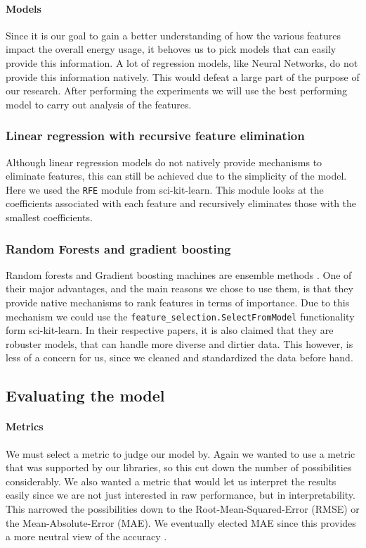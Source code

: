 \documentclass[british]{article}
\newcommand{\code}[1]{\texttt{#1}}
\begin{document}
	\paragraph{Models}Since it is our goal to gain a better understanding of how the various features impact the overall energy usage, it behoves us to pick models that can easily provide this information. A lot of regression models, like Neural Networks, do not provide this information natively. This would defeat a large part of the purpose of our research. After performing the experiments we will use the best performing model to carry out analysis of the features. 
	
	\subsubsection{Linear regression with recursive feature elimination} Although linear regression models do not natively provide mechanisms to eliminate features, this can still be achieved due to the simplicity of the model. Here we used the \code{RFE} module from sci-kit-learn. This module looks at the coefficients associated with each feature and recursively eliminates those with the smallest coefficients. 
	
	\subsubsection{Random Forests and gradient boosting} Random forests and Gradient boosting machines are ensemble methods \autocite{Breiman2001,Jeromeh1999}. One of their major advantages, and the main reasons we chose to use them, is that they provide native mechanisms to rank features in terms of importance. Due to this mechanism we could use the \code{feature\_selection.SelectFromModel} functionality form sci-kit-learn. In their respective papers, it is also claimed that they are robuster models, that can handle more diverse and dirtier data. This however, is less of a concern for us, since we cleaned and standardized the data before hand. 
	
	\subsection{Evaluating the model}
	\label{evaluation}
	
	\paragraph{Metrics}We must select a metric to judge our model by. Again we wanted to use a metric that was supported by our libraries, so this cut down the number of possibilities considerably. We also wanted a metric that would let us interpret the results easily since we are not just interested in raw performance, but in interpretability. This narrowed the possibilities down to the Root-Mean-Squared-Error  (RMSE) or the Mean-Absolute-Error (MAE). We eventually elected MAE since this provides a more neutral view of the accuracy \autocite{Willmott2009}.
	
\end{document}

